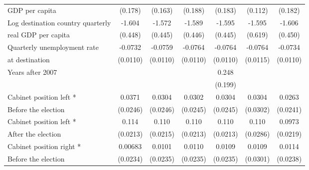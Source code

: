 \begin{table}[htbp]
\begin{tabular}{l*{6}{c}}
GDP per capita                    &     (0.178)         &   (0.163)                  &     (0.188)         &     (0.183)         &     (0.112)         &     (0.182)         \\
[0.5em]
Log destination country quarterly&      -1.604\sym{***}&      -1.572\sym{***}&      -1.589\sym{***}&      -1.595\sym{***}&      -1.595\sym{*}  &      -1.606\sym{***}\\
real GDP per capita                    &     (0.448)         &     (0.445)         &     (0.446)         &     (0.445)         &     (0.619)         &     (0.450)         \\
[0.5em]
Quarterly unemployment rate &     -0.0732\sym{***}&     -0.0759\sym{***}&     -0.0764\sym{***}&     -0.0764\sym{***}&     -0.0764\sym{***}&     -0.0734\sym{***}\\
at destination                    &    (0.0110)         &    (0.0110)         &    (0.0110)         &    (0.0110)         &    (0.0115)         &    (0.0110)         \\
[0.5em]
Years after 2007    &                     &                     &                     &       0.248         &                     &                     \\
                    &                     &                     &                     &     (0.199)         &                     &                     \\
[0.5em]
Cabinet position left * &      0.0371         &      0.0304         &      0.0302         &      0.0304         &      0.0304         &      0.0263         \\
 Before the election                   &    (0.0246)         &    (0.0246)         &    (0.0245)         &    (0.0245)         &    (0.0302)         &    (0.0241)         \\
[0.5em]
Cabinet position left * &       0.114\sym{***}&       0.110\sym{***}&       0.110\sym{***}&       0.110\sym{***}&       0.110\sym{***}&      0.0973\sym{***}\\
After the election                    &    (0.0213)         &    (0.0215)         &    (0.0213)         &    (0.0213)         &    (0.0286)         &    (0.0219)         \\
[0.5em]
Cabinet position right * &     0.00683         &      0.0101         &      0.0110         &      0.0109         &      0.0109         &      0.0114         \\
 Before the election                   &    (0.0234)         &    (0.0235)         &    (0.0235)         &    (0.0235)         &    (0.0301)         &    (0.0238)         \\

\end{tabular}
\end{table}
